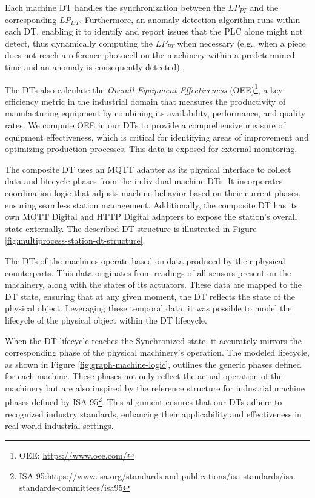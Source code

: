 Each machine DT handles the synchronization between the $LP_{PT}$ and the corresponding $LP_{DT}$. Furthermore, an anomaly detection algorithm runs within each DT, enabling it to identify and report issues that the PLC alone might not detect, thus dynamically computing the $LP_{PT}$ when necessary (e.g., when a piece does not reach a reference photocell on the machinery within a predetermined time and an anomaly is consequently detected).

The DTs also calculate the \textit{Overall Equipment Effectiveness} (OEE)\footnote{OEE: \url{https://www.oee.com/}}, a key efficiency metric in the industrial domain that measures the productivity of manufacturing equipment by combining its availability, performance, and quality rates. We compute OEE in our DTs to provide a comprehensive measure of equipment effectiveness, which is critical for identifying areas of improvement and optimizing production processes. This data is exposed for external monitoring.

The composite DT uses an MQTT adapter as its physical interface to collect data and lifecycle phases from the individual machine DTs. It incorporates coordination logic that adjusts machine behavior based on their current phases, ensuring seamless station management. Additionally, the composite DT has its own MQTT Digital and HTTP Digital adapters to expose the station’s overall state externally. The described DT structure is illustrated in Figure \ref{fig:multiprocess-station-dt-structure}.

The DTs of the machines operate based on data produced by their physical counterparts. This data originates from readings of all sensors present on the machinery, along with the states of its actuators. These data are mapped to the DT state, ensuring that at any given moment, the DT reflects the state of the physical object. Leveraging these temporal data, it was possible to model the lifecycle of the physical object within the DT lifecycle.

When the DT lifecycle reaches the Synchronized state, it accurately mirrors the corresponding phase of the physical machinery's operation. The modeled lifecycle, as shown in Figure \ref{fig:graph-machine-logic}, outlines the generic phases defined for each machine. These phases not only reflect the actual operation of the machinery but are also inspired by the reference structure for industrial machine phases defined by ISA-95\footnote{ISA-95:https://www.isa.org/standards-and-publications/isa-standards/isa-standards-committees/isa95}. This alignment ensures that our DTs adhere to recognized industry standards, enhancing their applicability and effectiveness in real-world industrial settings.

